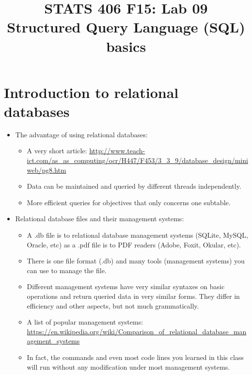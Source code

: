 \documentclass[12pt]{article}
\begin{document}
\title{\Large \bf STATS 406 F15: Lab 09\\Structured Query Language (SQL) basics}
\date{}

\maketitle

\section{Introduction to relational databases}
\begin{itemize}
	\item The advantage of using relational databases:
	\begin{itemize}[label=*]
		\item A very short article: \url{http://www.teach-ict.com/as_as_computing/ocr/H447/F453/3_3_9/database_design/miniweb/pg8.htm}
		\item Data can be maintained and queried by different threads independently.
		\item More efficient queries for objectives that only concerns one subtable.
	\end{itemize}
	\item Relational database files and their management systems:
	\begin{itemize}[label=*]
		\item A .db file is to relational database management systems (SQLite, MySQL, Oracle, etc) as a .pdf file is to PDF readers (Adobe, Foxit, Okular, etc).
		\item There is one file format (.db) and many tools (management systems) you can use to manage the file.
		\item Different management systems have very similar syntaxes on basic operations and return queried data in very similar forms. They differ in efficiency and other aspects, but not much grammatically.
		\item A list of popular management systems: \url{https://en.wikipedia.org/wiki/Comparison_of_relational_database_management_systems}
		\item In fact, the commands and even most code lines you learned in this class will run without any modification under most management systems.
	\end{itemize}
\end{itemize}
\end{document}
